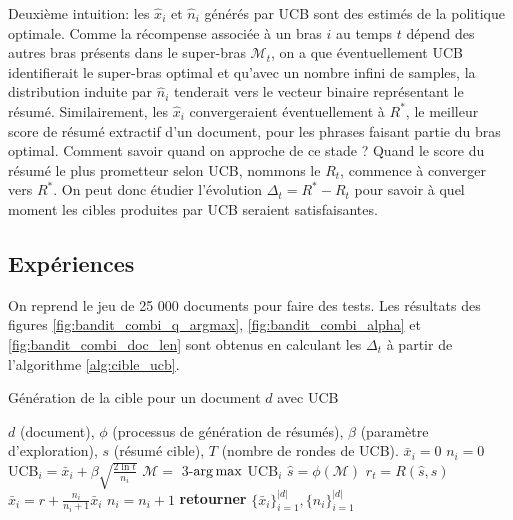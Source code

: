 Deuxième intuition: les $\hat{x}_i$ et $\hat{n}_i$ générés par UCB sont des estimés de
la politique optimale.
Comme la récompense associée à un bras $i$ au temps $t$ dépend des autres bras présents dans
le super-bras $\mathcal{M}_t$, on a que éventuellement UCB identifierait le super-bras optimal
et qu'avec un nombre infini de samples, la distribution induite par $\hat{n}_i$ tenderait
vers le vecteur binaire représentant le résumé.
Similairement, les $\hat{x}_i$ convergeraient éventuellement à $R^*$, le meilleur score de
résumé extractif d'un document, pour les phrases faisant partie du bras optimal.
Comment savoir quand on approche de ce stade ?
Quand le score du résumé le plus prometteur selon UCB, nommons le $R_t$, commence à converger vers $R^*$.
On peut donc étudier l'évolution $\Delta_t = R^* - R_t$ pour
savoir à quel moment les cibles produites par UCB seraient satisfaisantes.


\subsection{Expériences}

On reprend le jeu de 25 000 documents pour faire des tests.
Les résultats des figures \ref{fig:bandit_combi_q_argmax}, \ref{fig:bandit_combi_alpha}
et \ref{fig:bandit_combi_doc_len} sont obtenus en calculant les $\Delta_t$ à partir de
l'algorithme \ref{alg:cible_ucb}.

\begin{algorithm}
    \caption{Génération de la cible pour un document $d$ avec UCB}
    \begin{algorithmic}[1]
        \Require $d$ (document), $\phi$ (processus de génération de résumés), $\beta$ (paramètre d'exploration), $s$ (résumé cible), $T$ (nombre de rondes de UCB).
        \State $\bar{x}_i = 0$
        \State $n_i = 0$
        \EndFor
        \State UCB$_i = \bar{x}_i + \beta \sqrt{\frac{2 \ln t}{n_i}}$
        \EndFor
        \State $\mathcal{M} =$ 3-$\operatorname*{arg\,max}$ UCB$_i$
        \State $\hat{s} = \phi(\mathcal{M})$
        \State $r_t = R(\hat{s}, s)$
        \State $\bar{x}_i = r + \frac{n_i}{n_i + 1} \bar{x}_i$ 
        \State $n_i = n_i + 1$
        \EndFor
        \EndFor
        \EndProcedure
        \State \textbf{retourner}  $\{\bar{x}_i\}_{i=1}^{|d|}, \{n_i\}_{i=1}^{|d|}$
    \end{algorithmic}
    \label{alg:cible_ucb}
\end{algorithm}

